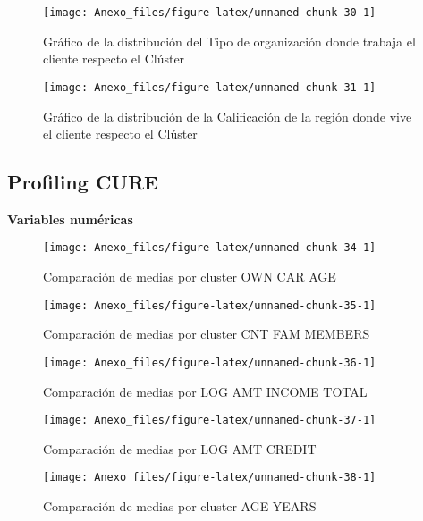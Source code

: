 \documentclass[
]{article}
\begin{document}
\begin{figure}
\texttt{[image: Anexo\_files/figure-latex/unnamed-chunk-30-1]} \caption{Gráfico de la distribución del Tipo de organización donde trabaja el cliente respecto el Clúster}\label{fig:unnamed-chunk-30}
\end{figure}

\begin{figure}
\texttt{[image: Anexo\_files/figure-latex/unnamed-chunk-31-1]} \caption{Gráfico de la distribución de la Calificación de la región donde vive el cliente respecto el Clúster}\label{fig:unnamed-chunk-31}
\end{figure}

\hypertarget{profiling-cure}{%
\subsection{Profiling CURE}\label{profiling-cure}}

\textbf{Variables numéricas}

\begin{figure}
\texttt{[image: Anexo\_files/figure-latex/unnamed-chunk-34-1]} \caption{Comparación de medias por cluster OWN CAR AGE}\label{fig:unnamed-chunk-34}
\end{figure}

\begin{figure}
\texttt{[image: Anexo\_files/figure-latex/unnamed-chunk-35-1]} \caption{Comparación de medias por cluster CNT FAM MEMBERS}\label{fig:unnamed-chunk-35}
\end{figure}

\begin{figure}
\texttt{[image: Anexo\_files/figure-latex/unnamed-chunk-36-1]} \caption{Comparación de medias por LOG AMT INCOME TOTAL}\label{fig:unnamed-chunk-36}
\end{figure}

\begin{figure}
\texttt{[image: Anexo\_files/figure-latex/unnamed-chunk-37-1]} \caption{Comparación de medias por LOG AMT CREDIT}\label{fig:unnamed-chunk-37}
\end{figure}

\begin{figure}
\texttt{[image: Anexo\_files/figure-latex/unnamed-chunk-38-1]} \caption{Comparación de medias por cluster AGE YEARS}\label{fig:unnamed-chunk-38}
\end{figure}
\end{document}
